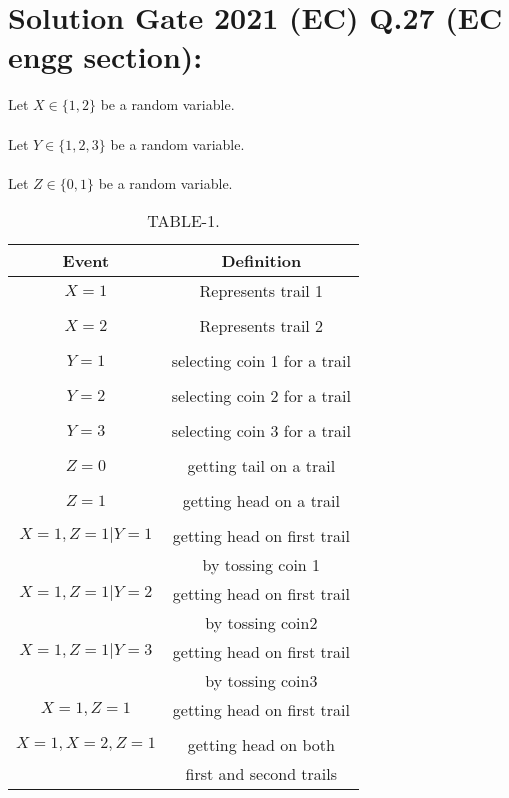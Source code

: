 \documentclass[journal,12pt,twocolumn]{IEEEtran}
\begin{document}
\section*{Solution Gate 2021 (EC) Q.27 (EC engg section):}
Let $X \in \{1,2\}$ be a random variable.\\
\\Let  $Y \in \{1,2,3\}$ be a random variable.\\
\\Let $Z \in \{0,1\}$ be a random variable.\\
\newpage
\begin{table}[h!]
 \resizebox{\columnwidth}{!}
    {
    \begin{tabular}{|c|c|}
    \hline
        Event & Definition \\
         \hline
         $X=1$ & Represents trail 1\\&\\
         \hline
         $X=2$ & Represents trail 2\\&\\
         \hline
         $Y=1$ & selecting coin 1 for a trail\\&\\
         \hline
         $Y=2$ & selecting coin 2 for a trail\\&\\
         \hline
         $Y=3$ & selecting coin 3 for a trail\\&\\
         \hline
         $Z=0$ & getting tail on a trail\\&\\
         \hline
         $Z=1$ & getting head on a trail\\&\\
         \hline 
         $X=1,Z=1|Y=1$ & getting head on first trail
         \\ & by tossing coin 1\\
         \hline
         $X=1,Z=1|Y=2$ & getting head on first trail
         \\ & by tossing coin2 \\
         \hline
         $X=1,Z=1|Y=3$ & getting head on first trail
         \\ & by tossing coin3 \\
         \hline
         $X=1,Z=1$ & getting head on first trail\\&\\
         \hline
         $X=1,X=2,Z=1$ & getting head on both \\ &first and second trails\\
         \hline
    \end{tabular}
    }
    \caption{\label{tab:table-1}TABLE-1.}
\end{table}
\end{document}
